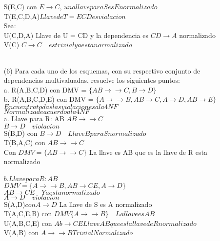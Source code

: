 \documentclass{article}
\begin{document}
\begin{enumerate}
    S(E,C) con $E \rightarrow C$, $una llave para S es E normalizado$\\
    T(E,C,D,A)$ Llave de T = ECD es violacion$\\
    Sea:\\
    U(C,D,A) Llave de U = CD y la dependencia es $CD \rightarrow A$ normalizado\\
    V(C) $C\rightarrow C \quad es trivial ya esta normalizado$\\
    \\
    \item[(6)]Para cada uno de los esquemas, con su respectivo conjunto de dependencias multivaluadas,
    resuelve los siguientes puntos:\\
    a. R(A,B,C,D) con DMV = $ \{ AB \rightarrow \rightarrow C, B \rightarrow D \} $\\
    b. R(A,B,C,D,E) con DMV = $\{ A \rightarrow \rightarrow B, AB \rightarrow C, A \rightarrow D, AB \rightarrow E\}$\\
    $Encuentra todas las violaciones a la 4NF$\\
    $Normaliza de acuerdo a la 4NF$\\
    a. Llave para R: AB
    $AB\rightarrow\rightarrow C$\\
    $B\rightarrow D \quad violacion$\\
    S(B,D) con $B \rightarrow D \quad Llave B para S normalizado$\\
    T(B,A,C) con $AB\rightarrow\rightarrow C$\\
    Con $DMV=\{AB\rightarrow\rightarrow C\} $ La llave es AB que es la llave de R esta normalizado\\
    \\
    $b. Llave para R: AB$\\
    $DMV= \{A \rightarrow\rightarrow B, AB\rightarrow CE,  A\rightarrow D \}$\\
    $AB \rightarrow CE \quad Ya esta normalizado$\\
    $A \rightarrow D \quad violacion$\\
    S(A,D)$ con A\rightarrow D$ La llave de S es A normalizado\\
    T(A,C,E,B) con $DMV\{A\rightarrow\rightarrow B\} \quad La llave es AB$\\
    U(A,B,C,E) con $Ab \rightarrow CE Llave AB que es la llave de R normalizado$\\
    V(A,B) con $A\rightarrow\rightarrow B Trivial Normalizado$\\
  \end{enumerate}
\end{document}
